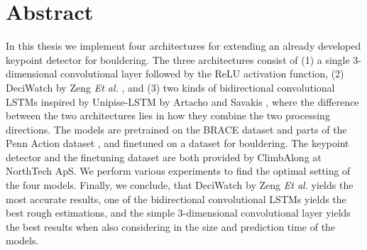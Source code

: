 \documentclass[./main.tex]{subfiles}
\begin{document}
\section*{Abstract}
In this thesis we implement four architectures for extending an already developed keypoint detector for bouldering. The three architectures consist of (1) a single 3-dimensional convolutional layer followed by the ReLU activation function, (2) DeciWatch by Zeng \textit{Et al.} \cite{https://doi.org/10.48550/arxiv.2203.08713}, and (3) two kinds of bidirectional convolutional LSTMs inspired by Unipise-LSTM by Artacho and Savakis \cite{https://doi.org/10.48550/arxiv.2001.08095}, where the difference between the two architectures lies in how they combine the two processing directions. The models are pretrained on the BRACE dataset \cite{BRACE} and parts of the Penn Action dataset \cite{penn_action}, and finetuned on a dataset for bouldering. The keypoint detector and the finetuning dataset are both provided by ClimbAlong at NorthTech ApS. We perform various experiments to find the optimal setting of the four models. Finally, we conclude, that DeciWatch by Zeng \textit{Et al.} \cite{https://doi.org/10.48550/arxiv.2203.08713} yields the most accurate results, one of the bidirectional convolutional LSTMs yields the best rough estimations, and the simple 3-dimensional convolutional layer yields the best results when also considering in the size and prediction time of the models.
\end{document}

